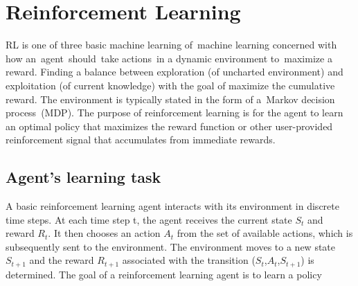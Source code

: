 \chapter{Reinforcement Learning}

RL is one of three basic machine learning of machine learning concerned with how an agent should take actions in a dynamic environment to maximize a reward. 
Finding a balance between exploration (of uncharted environment) and exploitation (of current knowledge) with the goal of maximize the cumulative reward. 
The environment is typically stated in the form of a Markov decision process (MDP).
The purpose of reinforcement learning is for the agent to learn an optimal policy that maximizes the reward function or other user-provided reinforcement signal that accumulates from immediate rewards.
\section{Agent's learning task}
A basic reinforcement learning agent interacts with its environment in discrete time steps. 
At each time step t, the agent receives the current state $S_t$ and reward $R_t$. 
It then chooses an action $A_t$ from the set of available actions, which is subsequently sent to the environment. 
The environment moves to a new state $S_{t+1}$ and the reward $R_{t+1}$ 
associated with the transition ($S_t$,$A_t$,$S_{t+1}$) is determined. 
The goal of a reinforcement learning agent is to learn a policy

